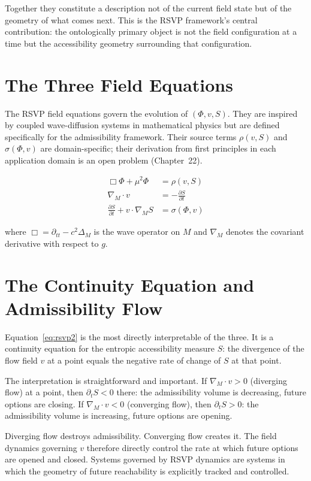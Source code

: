 \documentclass[12pt, oneside]{book}
\theoremstyle{flyxion}
\theoremstyle{definition}
\begin{document}
Together they constitute a description not of the
current field state but of the geometry of what comes
next. This is the RSVP framework's central contribution:
the ontologically primary object is not the field
configuration at a time but the accessibility geometry
surrounding that configuration.

\section{The Three Field Equations}

The RSVP field equations govern the evolution of
$(\Phi, v, S)$. They are inspired by coupled
wave-diffusion systems in mathematical physics but
are defined specifically for the admissibility
framework. Their source terms $\rho(v, S)$ and
$\sigma(\Phi, v)$ are domain-specific; their
derivation from first principles in each application
domain is an open problem (Chapter~22).

\begin{align}
\Box\Phi + \mu^2\Phi &= \rho(v, S) \label{eq:rsvp1} \\
\nabla_M \cdot v &= -\frac{\partial S}{\partial t}
\label{eq:rsvp2} \\
\frac{\partial S}{\partial t} + v \cdot \nabla_M S
&= \sigma(\Phi, v) \label{eq:rsvp3}
\end{align}

where $\Box = \partial_{tt} - c^2\Delta_M$ is the
wave operator on $M$ and $\nabla_M$ denotes the
covariant derivative with respect to $g$.

\section{The Continuity Equation and Admissibility Flow}

Equation~\eqref{eq:rsvp2} is the most directly
interpretable of the three. It is a continuity equation
for the entropic accessibility measure $S$: the
divergence of the flow field $v$ at a point equals
the negative rate of change of $S$ at that point.

The interpretation is straightforward and important.
If $\nabla_M \cdot v > 0$ (diverging flow) at a point,
then $\partial_t S < 0$ there: the admissibility volume
is decreasing, future options are closing. If
$\nabla_M \cdot v < 0$ (converging flow), then
$\partial_t S > 0$: the admissibility volume is
increasing, future options are opening.

Diverging flow destroys admissibility. Converging flow
creates it. The field dynamics governing $v$ therefore
directly control the rate at which future options are
opened and closed. Systems governed by RSVP dynamics
are systems in which the geometry of future reachability
is explicitly tracked and controlled.
\end{document}
